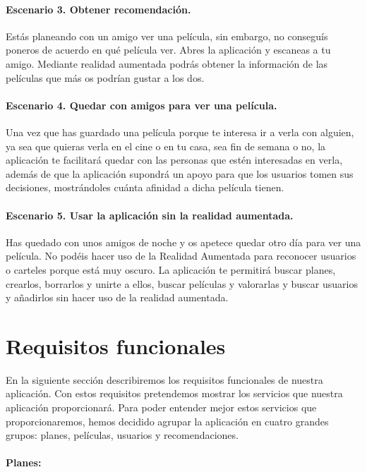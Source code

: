 \paragraph{Escenario 3. Obtener recomendación.}
    Estás planeando con un amigo ver una película, sin embargo, no conseguís poneros de acuerdo en qué película ver. Abres la aplicación y escaneas a tu amigo. Mediante realidad aumentada podrás obtener la información de las películas que más os podrían gustar a los dos. 



\paragraph{Escenario 4. Quedar con amigos para ver una película.}
    Una vez que has guardado una película porque te interesa ir a verla con alguien, ya sea que quieras verla en el cine o en tu casa, sea fin de semana o no, la aplicación te facilitará quedar 
    con las personas que estén interesadas en verla, además de que la aplicación supondrá un apoyo para que los usuarios tomen sus decisiones, mostrándoles cuánta afinidad a dicha película tienen.

\paragraph{Escenario 5. Usar la aplicación sin la realidad aumentada.}
     Has quedado con unos amigos de noche y os apetece quedar otro día para ver una película. No podéis hacer uso de la Realidad Aumentada para reconocer usuarios o carteles porque está muy oscuro. La aplicación te permitirá buscar 
     planes, crearlos, borrarlos y unirte a ellos, buscar películas y valorarlas y buscar usuarios y añadirlos sin hacer uso de la realidad aumentada.

\section{Requisitos funcionales}
\label{makereference3.3}
En la siguiente sección describiremos los requisitos funcionales de nuestra aplicación. Con estos requisitos pretendemos mostrar los servicios que nuestra aplicación proporcionará.
Para poder entender mejor estos servicios que proporcionaremos, hemos decidido agrupar la aplicación en cuatro grandes grupos: planes, películas, usuarios y recomendaciones.

\paragraph{\large Planes:\\}

